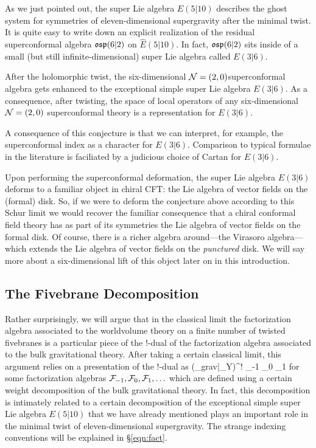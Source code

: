 As we just pointed out, the super Lie algebra $\widehat E(5|10)$ describes the ghost system for symmetries of eleven-dimensional supergravity after the minimal twist.
It is quite easy to write down an explicit realization of the residual superconformal algebra $\mathfrak{osp}(6|2)$ on $\widehat E(5|10)$.
In fact, $\mathfrak{osp}(6|2)$ sits inside of a small (but still infinite-dimensional) super Lie algebra called $E(3|6)$. 

\begin{conj}
After the holomorphic twist, the six-dimensional $\mathcal N = (2,0) $superconformal algebra gets enhanced to the exceptional simple super Lie algebra $E(3|6)$.
As a consequence, after twisting, the space of local operators of any six-dimensional $\mathcal N=(2,0)$ superconformal theory is a representation for $E(3|6)$.
\end{conj}

A consequence of this conjecture is that we can interpret, for example, the superconformal index as a character for $E(3|6)$. Comparison to typical formulae in the literature is faciliated by a judicious choice of Cartan for $E(3|6)$.

Upon performing the superconformal deformation, the super Lie algebra $E(3|6)$ deforms to a familiar object in chiral CFT: the Lie algebra of vector fields on the (formal) disk.
So, if we were to deform the conjecture above according to this Schur limit we would recover the familiar consequence that a chiral conformal field theory has as part of its symmetries the Lie algebra of vector fields on the formal disk.
Of course, there is a richer algebra around---the Virasoro algebra---which extends the Lie algebra of vector fields on the {\em punctured} disk. 
We will say more about a six-dimensional lift of this object later on in this introduction.

\subsection{The Fivebrane Decomposition}
Rather surprisingly, we will argue that in the classical limit the factorization algebra associated to the worldvolume theory on a finite number of twisted fivebranes is a particular piece of the $!$-dual of the factorization algebra associated to the bulk gravitational theory. 
After taking a certain classical limit, this argument relies on a presentation of the $!$-dual as
\beqn
(\Obs_{grav}|_{Y})^{!} \simeq \cF_{-1} \otimes \cF_0 \otimes \cF_1 \otimes \cdots 
\eeqn
for some factorization algebras $\mathcal F_{-1},\mathcal F_0, \mathcal F_{1},\ldots$ which are defined using a certain weight decomposition of the bulk gravitational theory.
In fact, this decomposition is intimately related to a certain decomposition of the exceptional simple super Lie algebra $E(5|10)$ that we have already mentioned plays an important role in the minimal twist of eleven-dimensional supergravity.
The strange indexing conventions will be explained in \S\ref{eqn:fact}. 

